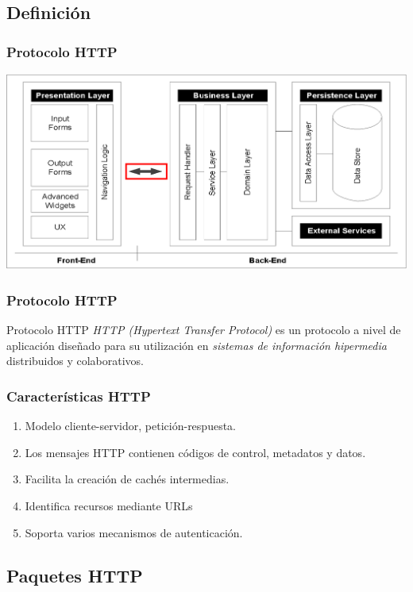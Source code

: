\documentclass[a4paper,slidestop,xcolor=pst,blue]{beamer}
\begin{document}
\subsection{Definición}

\begin{frame}[c]
    \frametitle{Protocolo HTTP}
    \begin{center}
        \includegraphics[width=\linewidth]{images/http/enterpriseArchitectures02.eps}
    \end{center}
\end{frame}

\begin{frame}[c]
    \frametitle{Protocolo HTTP}
    \begin{block}{Protocolo HTTP}
        \emph{HTTP (Hypertext Transfer Protocol)} es un protocolo a nivel de aplicación diseñado para su utilización en \emph{sistemas de información hipermedia} distribuidos y colaborativos.
    \end{block}
\end{frame}

\begin{frame}[c]
    \frametitle{Características HTTP}
    \begin{enumerate}[<+->]
        \item Modelo cliente-servidor, petición-respuesta.
        \item Los mensajes HTTP contienen códigos de control, metadatos y datos.    
        \item Facilita la creación de cachés intermedias.
        \item Identifica recursos mediante URLs
        \item Soporta varios mecanismos de autenticación.
    \end{enumerate}
\end{frame}

\subsection{Paquetes HTTP}
\end{document}

